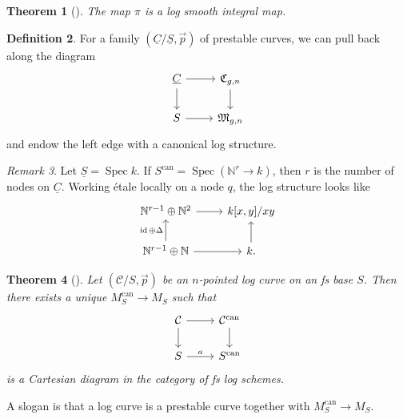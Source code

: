 \documentclass{amsart}
\newtheorem{thm}{Theorem}[section]
\theoremstyle{definition}
\newtheorem{defn}[thm]{Definition}
\theoremstyle{remark}
\newtheorem{rmk}[thm]{Remark}
\theoremstyle{plain}
\theoremstyle{definition}
\theoremstyle{remark}
\newcommand{\N}{\mathbb{N}}
\newcommand{\mc}[1]{\mathcal{#1}}
\newcommand{\mf}[1]{\mathfrak{#1}}
\newcommand{\on}[1]{\operatorname{#1}}
\newcommand{\ul}[1]{\underline{#1}}
\newcommand{\1}{\mathbf{1}}
\newcommand{\2}{\mathbf{2}}
\newcommand{\3}{\mathbf{3}}
\DeclareMathOperator{\Spec}{Spec}
\begin{document}
\begin{thm}[{\cite{FKato2000}}]
    The map \(\pi\) is a log smooth integral map.
\end{thm}

\begin{defn}
    For a family \((\ul{C}/\ul{S}, \vec{p})\) of prestable curves, we can pull back along the diagram
    \begin{equation*}
    \begin{tikzcd}
        \ul{C} \ar{r} \ar{d} & \mf{C}_{g,n} \ar{d} \\
        S \ar{r} & \mf{M}_{g,n}
    \end{tikzcd}
    \end{equation*}
    and endow the left edge with a canonical log structure.
\end{defn}

\begin{rmk}
    Let \(\ul{S} = \Spec k\). If \(S^{\on{can}} = \Spec (\N^r \to k)\), then \(r\) is the number of nodes on \(\ul{C}\). Working \'etale locally on a node \(q\), the log structure looks like
    \begin{equation*}
    \begin{tikzcd}
        \N^{r-1} \oplus \N^2 \ar{r} & k[x,y]/xy \\
        \N^{r-1} \oplus \N \ar{u}{\on{id}\oplus\Delta} \ar{r} & k \ar{u}.
    \end{tikzcd}
    \end{equation*}
\end{rmk}

\begin{thm}[{\cite{FKato2000}}]
    Let \((\mc{C}/S, \vec{p})\) be an \(n\)-pointed log curve on an fs base \(S\). Then there exists a unique \(M_S^{\on{can}} \to M_S\) such that
    \begin{equation*}
    \begin{tikzcd}
        \mc{C} \ar{d} \ar{r} & \mc{C}^{\on{can}} \ar{d} \\
        S \ar{r}{a} & S^{\on{can}}
    \end{tikzcd}
    \end{equation*}
    is a Cartesian diagram in the category of fs log schemes.
\end{thm}

A slogan is that a log curve is a prestable curve together with \(M_S^{\on{can}} \to M_S\).
\end{document}
